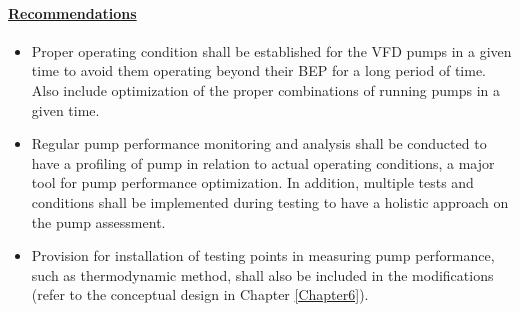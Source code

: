 

\paragraph{\underline{Recommendations}}

\begin{itemize}
\item	Proper operating condition shall be established for the VFD pumps in a given time to avoid them operating beyond their BEP for a long period of time. Also include optimization of the proper combinations of running pumps in a given time.
\item	Regular pump performance monitoring and analysis shall be conducted to have a profiling of pump in relation to actual operating conditions, a major tool for pump performance optimization. In addition, multiple tests and conditions shall be implemented during testing to have a holistic approach on the pump assessment.
\item	Provision for installation of testing points in measuring pump performance, such as thermodynamic method, shall also be included in the modifications  (refer to the conceptual design in Chapter \ref{Chapter6}).
\end{itemize}

